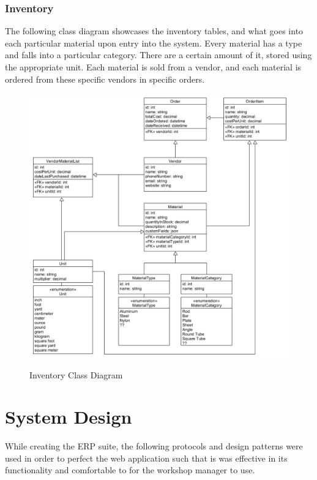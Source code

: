 {{{{{{{\subsubsection{Inventory}
The following class diagram showcases the inventory tables, and what goes into each particular material upon entry into the system. Every material has a type and falls into a particular category. There are a certain amount of it, stored using the appropriate unit. Each material is sold from a vendor, and each material is ordered from these specific vendors in specific orders. 
\begin{figure}[H]
	\centering
	\includegraphics[width=5in]{Inventory.png}\\
	\caption{Inventory Class Diagram}
	\label{fig:tobias}
\end{figure}
\newpage

\section{System Design}
While creating the ERP suite, the following protocols and design patterns were used in order to perfect the web application such that is was effective in its functionality and comfortable to for the workshop manager to use. 

}}}}}}}
